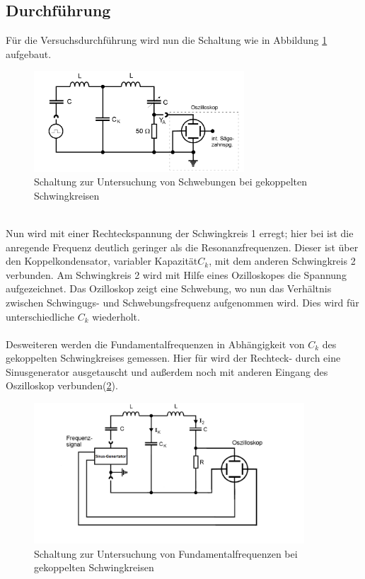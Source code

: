 \subsection{Durchführung}
\label{subsec:Durchführung}
Für die Versuchsdurchführung wird nun die Schaltung
wie in Abbildung \ref{abb:schwebungsaufbau} aufgebaut.
\begin{figure}[h]
   \centering
   \includegraphics[width=0.7\textwidth]{Aufbau_a).PNG}
   \caption{Schaltung zur Untersuchung von Schwebungen bei gekoppelten Schwingkreisen \cite{skript}}
   \label{abb:schwebungsaufbau}
\end{figure}\\
Nun wird mit einer Rechteckspannung der
Schwingkreis 1 erregt; hier bei ist die anregende Frequenz
deutlich geringer als die Resonanzfrequenzen.
Dieser ist über den Koppelkondensator,
variabler Kapazität$C_k$, mit dem anderen Schwingkreis 2
verbunden. Am Schwingkreis 2 wird mit
Hilfe eines Ozilloskopes die Spannung aufgezeichnet.
Das Ozilloskop zeigt eine Schwebung, wo nun das Verhältnis
zwischen Schwingugs- und Schwebungsfrequenz aufgenommen wird.
Dies wird für unterschiedliche $C_k$ wiederholt.\\
\\
Desweiteren werden die Fundamentalfrequenzen
in Abhängigkeit von $C_k$
des gekoppelten Schwingkreises gemessen.
Hier für wird der Rechteck- durch
eine Sinusgenerator ausgetauscht und außerdem
noch mit anderen Eingang des Oszilloskop verbunden(\ref{abb:fundamentalaufbau}).
\begin{figure}[h]
  \centering
  \includegraphics[width=0.9\textwidth]{physik.PNG}
  \caption{Schaltung zur Untersuchung von Fundamentalfrequenzen bei gekoppelten Schwingkreisen \cite{skript}}
  \label{abb:fundamentalaufbau}
\end{figure}\\
